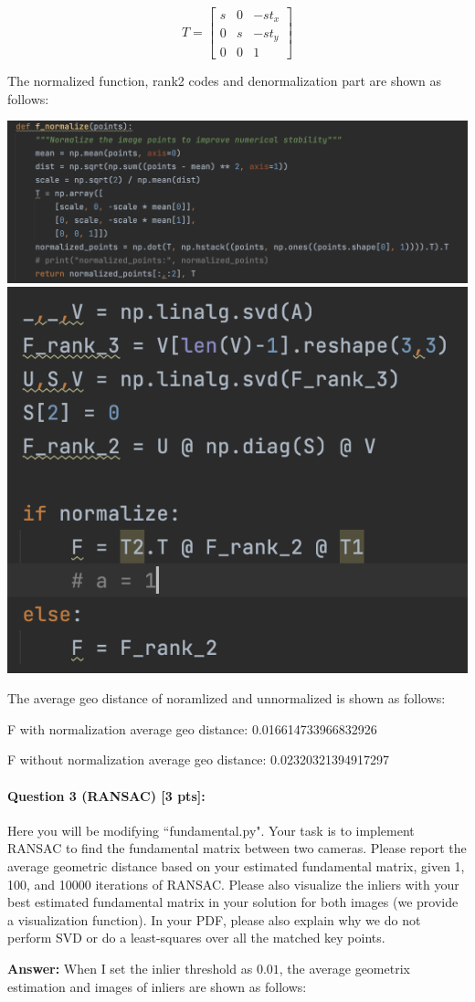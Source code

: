 \documentclass[11pt]{article}
\begin{document}
\[T = 
\left[
\begin{array}{ccc}
    s & 0 & -st_x \\
    0 & s & -st_y \\
    0 & 0 & 1
\end{array}
\right]
\]

The normalized function, rank2 codes and denormalization part are shown as follows:

\begin{center}
    \small
    \includegraphics[width=0.4\linewidth]{fig/q2normalized _unction.png}
    \includegraphics[width=0.4\linewidth]{fig/q2reconstruct.png}
\end{center}

The average geo distance of noramlized and unnormalized is shown as follows:

F with normalization average geo distance: 0.016614733966832926

F without normalization average geo distance: 0.02320321394917297

\paragraph{Question 3 (RANSAC) [3 pts]:} Here you will be modifying ``fundamental.py". Your task is to implement RANSAC to find the fundamental matrix between two cameras. Please report the average geometric distance based on your estimated fundamental matrix, given 1, 100, and 10000 iterations of RANSAC. Please also visualize the inliers with your best estimated fundamental matrix in your solution for both images (we provide a visualization function). In your PDF, please also explain why we do not perform SVD or do a least-squares over all the matched key points. 

\textbf{Answer: } When I set the inlier threshold as $0.01$, the average geometrix estimation and images of inliers are shown as follows:
\end{document}
